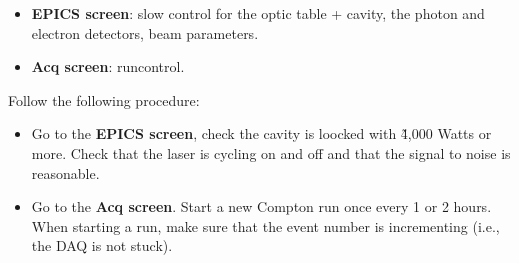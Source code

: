 \begin{itemize}
\item {\bf EPICS screen}: slow control for the optic table + cavity, the 
photon and electron detectors, beam parameters.
\item {\bf Acq screen}: runcontrol.
 \end{itemize}

Follow the following procedure:
\begin{itemize}
\item Go to the {\bf EPICS screen}, check the cavity is loocked with \~4,000 Watts 
or more. Check that the laser is cycling on and off and that the signal to noise is reasonable.
\item Go to the {\bf Acq screen}. Start a new Compton run once every 1 or 2 hours. When starting a run,
make sure that the event number is incrementing (i.e., the DAQ is not stuck).
\end{itemize}

